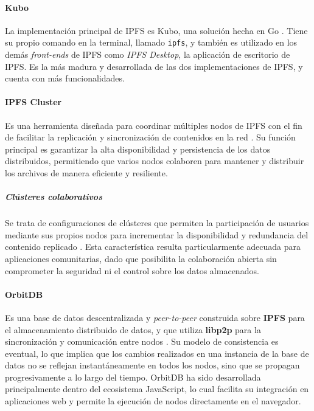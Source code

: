 \paragraph{Kubo}
La implementación principal de IPFS es Kubo, una solución hecha en Go \cite{kubo}. Tiene su propio comando en la terminal, llamado \texttt{ipfs}, y también es utilizado en los demás \textit{front-ends} de IPFS como \textit{IPFS Desktop}, la aplicación de escritorio de IPFS. Es la más madura y desarrollada de las dos implementaciones de IPFS, y cuenta con más funcionalidades.

\paragraph{IPFS Cluster} 
Es una herramienta diseñada para coordinar múltiples nodos de IPFS con el fin de facilitar la replicación y sincronización de contenidos en la red \cite{ipfs-cluster}. Su función principal es garantizar la alta disponibilidad y persistencia de los datos distribuidos, permitiendo que varios nodos colaboren para mantener y distribuir los archivos de manera eficiente y resiliente.

\subparagraph{Clústeres colaborativos} 

Se trata de configuraciones de clústeres que permiten la participación de usuarios mediante sus propios nodos para incrementar la disponibilidad y redundancia del contenido replicado \cite{collaborative-clusters}. Esta característica resulta particularmente adecuada para aplicaciones comunitarias, dado que posibilita la colaboración abierta sin comprometer la seguridad ni el control sobre los datos almacenados.

\paragraph{OrbitDB}
Es una base de datos descentralizada y \textit{peer-to-peer} construida sobre \textbf{IPFS} para el almacenamiento distribuido de datos, y que utiliza \textbf{libp2p} para la sincronización y comunicación entre nodos \cite{orbitdb}. Su modelo de consistencia es eventual, lo que implica que los cambios realizados en una instancia de la base de datos no se reflejan instantáneamente en todos los nodos, sino que se propagan progresivamente a lo largo del tiempo.
OrbitDB ha sido desarrollada principalmente dentro del ecosistema JavaScript, lo cual facilita su integración en aplicaciones web y permite la ejecución de nodos directamente en el navegador.

